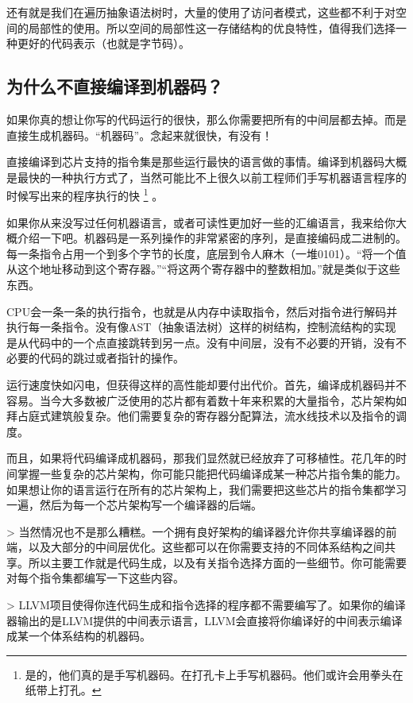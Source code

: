 \documentclass[cn,10pt,math=newtx,citestyle=gb7714-2015,bibstyle=gb7714-2015]{elegantbook}
\begin{document}
还有就是我们在遍历抽象语法树时，大量的使用了访问者模式，这些都不利于对空间的局部性的使用。所以空间的局部性这一存储结构的优良特性，值得我们选择一种更好的代码表示（也就是字节码）。

\subsection{为什么不直接编译到机器码？}

如果你真的想让你写的代码运行的很快，那么你需要把所有的中间层都去掉。而是直接生成机器码。“机器码”。念起来就很快，有没有！

直接编译到芯片支持的指令集是那些运行最快的语言做的事情。编译到机器码大概是最快的一种执行方式了，当然可能比不上很久以前工程师们手写机器语言程序的时候写出来的程序执行的快 \footnote{是的，他们真的是手写机器码。在打孔卡上手写机器码。他们或许会用拳头在纸带上打孔。} 。

如果你从来没写过任何机器语言，或者可读性更加好一些的汇编语言，我来给你大概介绍一下吧。机器码是一系列操作的非常紧密的序列，是直接编码成二进制的。每一条指令占用一个到多个字节的长度，底层到令人麻木（一堆0101）。“将一个值从这个地址移动到这个寄存器。”“将这两个寄存器中的整数相加。”就是类似于这些东西。

CPU会一条一条的执行指令，也就是从内存中读取指令，然后对指令进行解码并执行每一条指令。没有像AST（抽象语法树）这样的树结构，控制流结构的实现是从代码中的一个点直接跳转到另一点。没有中间层，没有不必要的开销，没有不必要的代码的跳过或者指针的操作。

运行速度快如闪电，但获得这样的高性能却要付出代价。首先，编译成机器码并不容易。当今大多数被广泛使用的芯片都有着数十年来积累的大量指令，芯片架构如拜占庭式建筑般复杂。他们需要复杂的寄存器分配算法，流水线技术以及指令的调度。

而且，如果将代码编译成机器码，那我们显然就已经放弃了可移植性。花几年的时间掌握一些复杂的芯片架构，你可能只能把代码编译成某一种芯片指令集的能力。如果想让你的语言运行在所有的芯片架构上，我们需要把这些芯片的指令集都学习一遍，然后为每一个芯片架构写一个编译器的后端。

> 当然情况也不是那么糟糕。一个拥有良好架构的编译器允许你共享编译器的前端，以及大部分的中间层优化。这些都可以在你需要支持的不同体系结构之间共享。所以主要工作就是代码生成，以及有关指令选择方面的一些细节。你可能需要对每个指令集都编写一下这些内容。

> LLVM项目使得你连代码生成和指令选择的程序都不需要编写了。如果你的编译器输出的是LLVM提供的中间表示语言，LLVM会直接将你编译好的中间表示编译成某一个体系结构的机器码。
\end{document}
